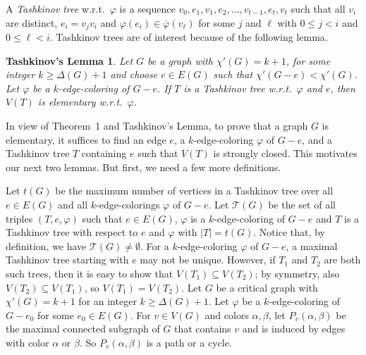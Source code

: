 \documentclass[12pt]{amsart}
\theoremstyle{plain}
\newtheorem*{lemmaA}{Tashkinov's Lemma}
\theoremstyle{definition}
\theoremstyle{remark}
\newcommand{\fancy}[1]{\mathcal{#1}}
\newcommand{\T}{\fancy{T}}
\newcommand{\vph}{\varphi}
\newcommand{\vphn}{\overline{\varphi}}
\begin{document}
A \emph{Tashkinov tree} w.r.t.~$\varphi$ is a sequence $v_0, e_1, v_1,
e_2,\ldots, v_{t-1},e_t,v_t$ such that all $v_i$ are distinct, $e_i=v_jv_i$ and
$\vph(e_i)\in \vphn(v_\ell)$ for some $j$ and $\ell$ with $0\le j< i$ and $0\le
\ell < i$.  Tashkinov trees are of interest because of the following lemma. 

\begin{lemmaA}%
Let $G$ be a graph with $\chi'(G)=k+1$, for some integer $k\ge \Delta(G)+1$ and
choose $e\in E(G)$ such that $\chi'(G-e)<\chi'(G)$.  Let $\varphi$ be a
$k$-edge-coloring of $G-e$.  If $T$ is a Tashkinov tree w.r.t.~$\varphi$ and
$e$, then $V(T)$ is elementary w.r.t.~$\varphi$.
\end{lemmaA}

In view of Theorem~1 and Tashkinov's Lemma, to prove that a graph $G$ is elementary,
it suffices to find an edge $e$, a $k$-edge-coloring $\vph$ of $G-e$, and a
Tashkinov tree $T$ containing $e$ such that $V(T)$ is strongly closed.
This motivates our next two lemmas.  But first, we need a few more definitions.

Let $t(G)$ be the maximum number of vertices in a Tashkinov tree over all $e \in E(G)$
and all $k$-edge-colorings $\vph$ of $G - e$.  Let $\T(G)$ be the set of all triples $(T,e,\vph)$ such that $e \in E(G)$, $\vph$ is a $k$-edge-coloring of $G-e$ and
$T$ is a Tashkinov tree with respect to $e$ and $\vph$ with $|T| = t(G)$.  Notice that, by definition, we have $\T(G) \ne \emptyset$.
%
For a $k$-edge-coloring $\vph$ of $G-e$, a maximal Tashkinov tree
starting with $e$ may not be unique.  However, if $T_1$ and $T_2$ are both such
trees, then it is easy to show that $V(T_1)\subseteq V(T_2)$; by symmetry, also
$V(T_2)\subseteq V(T_1)$, so $V(T_1)=V(T_2)$.
%
Let $G$ be a critical graph with $\chi'(G) = k+1$ for an integer $k \ge \Delta(G) + 1$. 
Let $\varphi$ be a $k$-edge-coloring of $G - e_0$ for some $e_0 \in E(G)$.  
For $v \in V(G)$ and colors $\alpha, \beta$, let $P_v(\alpha, \beta)$ be the
maximal connected subgraph of $G$ that contains $v$ and is induced by edges with color
$\alpha$ or $\beta$.  So $P_v(\alpha, \beta)$ is a path or a cycle.

\end{document}
